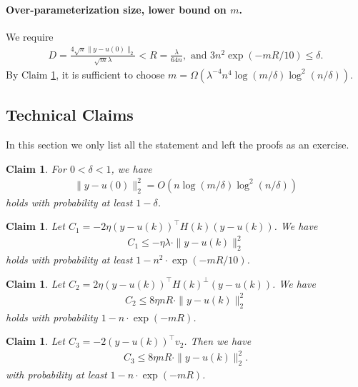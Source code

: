 \documentclass[11pt]{article}
\newtheorem{claim}[theorem]{Claim}
\begin{document}
\paragraph{Over-parameterization size, lower bound on $m$.}

We require {%
\begin{align*}
 D=  \frac{4\sqrt{n}\|y-u(0)\|_2}{\sqrt{m}\lambda} < R = \frac{\lambda}{64n} ,
\text{~and~}  3n^2\exp(-mR/10)\leq  \delta .
\end{align*}}
By Claim \ref{cla:yu0},
 it is sufficient to choose $m = \Omega( \lambda^{-4} n^4 \log(m/\delta)\log^2(n/\delta) )$.

\subsection{Technical Claims}

In this section we only list all the statement and left the proofs as an exercise.
 \begin{claim}\label{cla:yu0}
For $0 < \delta < 1$, we have
\begin{align*}
\|y-u(0)\|_2^2=O(n\log(m/\delta)\log^2(n/\delta))
\end{align*}
holds with probability at least $1-\delta$.
\end{claim}



\begin{claim}\label{cla:C1}
Let $C_1 = -2 \eta (y - u(k))^\top H(k) ( y - u(k) )$. We have
\begin{align*}
C_1 \leq - \eta \lambda\cdot \| y - u(k) \|_2^2 
\end{align*}
holds with probability at least $1-n^2 \cdot \exp(-m R /10)$.
\end{claim}


\begin{claim}\label{cla:C2}
Let $C_2 = 2 \eta ( y - u(k) )^\top H(k)^{\bot} ( y - u(k) )$. We have
\begin{align*}
C_2 \leq 8\eta nR\cdot \| y - u(k) \|_2^2
\end{align*}
holds with probability $1-n\cdot \exp(-mR)$.
\end{claim}





\begin{claim}\label{cla:C3}
Let $C_3 = - 2 (y - u(k))^\top v_2$. Then we have
\begin{align*}
C_3 \leq 8 \eta nR\cdot \| y - u(k) \|_2^2  .
\end{align*}
with probability at least $1-n\cdot \exp(-mR)$.
\end{claim}
\end{document}
